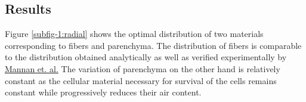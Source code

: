 \documentclass[10pt]{article}
\begin{document}
\subsection{Results}
Figure \ref{subfig-1:radial} shows the optimal distribution of two materials corresponding to fibers and parenchyma. The distribution of fibers is comparable to the distribution obtained analytically as well as verified experimentally by \hyperref[mannan2017correlations]{Mannan et. al.}\cite{mannan2017correlations}
The variation of parenchyma on the other hand is relatively constant as the cellular material necessary for survival of the cells remains constant while progressively reduces their air content.
\begin{figure}[H]
\begin{center}
\end{center}
\end{figure}
\end{document}
